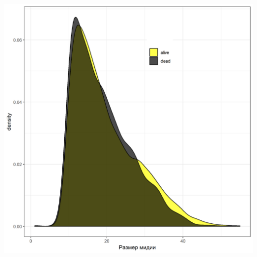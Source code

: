 \documentclass[20pt,a0,portrait]{a0poster}
\begin{document}
\vspace{1cm}


\begin{minipage}[t]{0.46\linewidth}


\subsection*{}
		





%
\begin{minipage}[t]{0.46\linewidth}		
	\begin{center}\vspace{0.1cm}
			\includegraphics[width=0.9\linewidth]{Size_dist_ast.png}
			\label{Fig_siz_ast}
		\end{center}\vspace{0.5cm}
\end{minipage}\hspace{1cm}
%
\begin{minipage}[t]{0.46\linewidth}		
	\begin{center}\vspace{0.1cm}

\end{center}
\end{minipage}
\end{minipage}
\end{document}
